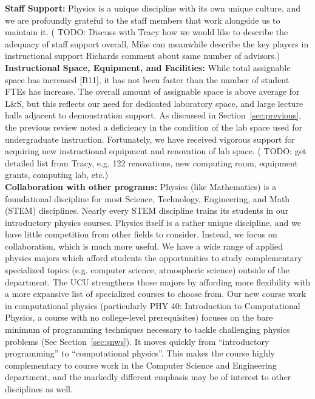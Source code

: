 \documentclass[12pt]{article}
\begin{document}
\noindent
{\bf Staff Support:} Physics is a unique discipline with its own
unique culture, and we are profoundly grateful to the staff members
that work alongside us to maintain it.  ({\color{red} TODO: Discuss
  with Tracy how we would like to describe the adequacy of staff
  support overall, Mike can meanwhile describe the key players in
  instructional support} Richards comment about same number of
advisors.)\\[3pt]


\noindent
{\bf Instructional Space, Equipment, and Facilities:} While total
assignable space has increased [B11], it has not been faster than the
number of student FTEs has increase.  The overall amount of assignable
space is above average for L\&S, but this reflects our need for
dedicated laboratory space, and large lecture halls adjacent to
demonstration support.  As discussed in Section~\ref{sec:previous},
the previous review noted a deficiency in the condition of the lab
space used for undergraduate instruction.  Fortunately, we have
received vigorous support for acquiring new instructional equipment
and renovation of lab space.  ({\color{red} TODO: get detailed list
  from Tracy, e.g. 122 renovations, new computing room, equipment
  grants, computing lab, etc}.)\\[3pt]

\noindent
{\bf Collaboration with other programs: } Physics (like Mathematics)
is a foundational discipline for most Science, Technology,
Engineering, and Math (STEM) disciplines.  Nearly every STEM
discipline trains its students in our introductory physics courses.
Physics itself is a rather unique discipline, and we have little
competition from other fields to consider.  Instead, we focus on
collaboration, which is much more useful.  We have a wide range of
applied physics majors which afford students the opportunities to
study complementary specialized topics (e.g. computer science,
atmospheric science) outside of the department.  The UCU strengthens
those majors by affording more flexibility with a more expansive list
of specialized courses to choose from.  Our new course work in
computational physics (particularly PHY 40: Introduction to
Computational Physics, a course with no college-level prerequisites)
focuses on the bare minimum of programming techniques necessary to
tackle challenging physics problems (See Section~\ref{sec:snws}).  It
moves quickly from ``introductory programming'' to ``computational
physics''.  This makes the course highly complementary to course work
in the Computer Science and Engineering department, and the markedly
different emphasis may be of interest to other disciplines as
well.\\[3pt]
\end{document}
